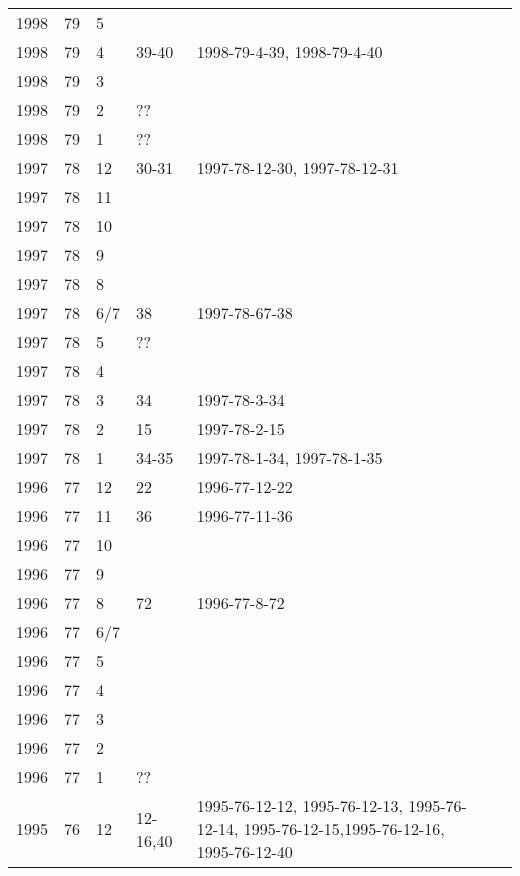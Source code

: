 \begin{longtable}{ |l|l|l|l|p{2.7cm}|l|p{2cm}| }
 1998 & 79 &     5 &         &  &  & \\
 1998 & 79 &     4 &   39-40 & 1998-79-4-39, 1998-79-4-40 &  & \\
 1998 & 79 &     3 &         &  &  & \\
 1998 & 79 &     2 &     ??  &  &  & \\
 1998 & 79 &     1 &     ??  &  &  & \\
 1997 & 78 &    12 &    30-31   & 1997-78-12-30, 1997-78-12-31  &  & \\
 1997 & 78 &    11 &         &  &  & \\
 1997 & 78 &    10 &         &  &  & \\
 1997 & 78 &     9 &         &  &  & \\
 1997 & 78 &     8 &         &  &  & \\
 1997 & 78 &   6/7 &    38   & 1997-78-67-38  &  & \\
 1997 & 78 &     5 &     ??  &  &  & \\
 1997 & 78 &     4 &         &  &  & \\
 1997 & 78 &     3 &    34   & 1997-78-3-34 &  & \\
 1997 & 78 &     2 &    15   & 1997-78-2-15  &  & \\
 1997 & 78 &     1 &   34-35 & 1997-78-1-34, 1997-78-1-35 &  & \\
 1996 & 77 &    12 &    22   & 1996-77-12-22 &  & \\
 1996 & 77 &    11 &    36   & 1996-77-11-36 &  & \\
 1996 & 77 &    10 &         &                &  & \\
 1996 & 77 &     9 &         &                &  & \\
 1996 & 77 &     8 &    72   & 1996-77-8-72 &  & \\
 1996 & 77 &   6/7 &         &                &  & \\
 1996 & 77 &     5 &         &                &  & \\
 1996 & 77 &     4 &         &                &  & \\
 1996 & 77 &     3 &         &                &  & \\
 1996 & 77 &     2 &         &                &  & \\
 1996 & 77 &     1 &     ??  &                &  & \\
 1995 & 76 &    12 &12-16,40 & 1995-76-12-12, 1995-76-12-13, 1995-76-12-14, 1995-76-12-15,1995-76-12-16, 1995-76-12-40 &  & \\

\end{longtable}
